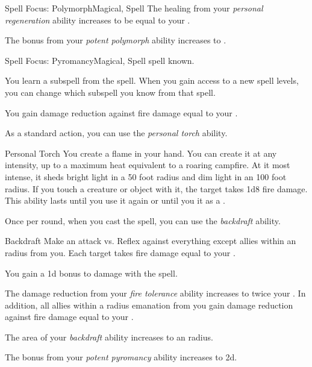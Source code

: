 \begin{feat}{Spell Focus: Polymorph}{Magical, Spell}
         The healing from your \textit{personal regeneration} ability increases to be equal to your .

         The bonus from your \textit{potent polymorph} ability increases to .
    \end{feat}

    \begin{feat}{Spell Focus: Pyromancy}{Magical, Spell}
        \featpre {} spell known.

         You learn a subspell from the  spell.
        When you gain access to a new spell levels, you can change which subspell you know from that spell.

         You gain damage reduction against fire damage equal to your .

         As a standard action, you can use the \textit{personal torch} ability.
        \begin{ability}{Personal Torch}
            You create a flame in your hand.
            You can create it at any intensity, up to a maximum heat equivalent to a roaring campfire.
            At it most intense, it sheds bright light in a 50 foot radius and dim light in an 100 foot radius.
            If you touch a creature or object with it, the target takes 1d8 fire damage.
            This ability lasts until you use it again or until you  it as a .
        \end{ability}

         Once per round, when you cast the  spell, you can use the \textit{backdraft} ability.
        \begin{ability}{Backdraft}
            Make an attack vs. Reflex against everything except allies within an \areasmall radius from you.
            \hit Each target takes fire damage equal to your .
        \end{ability}

         You gain a \plus1d bonus to damage with the  spell.

         The damage reduction from your \textit{fire tolerance} ability increases to twice your .
        In addition, all allies within a \areamed radius emanation from you gain damage reduction against fire damage equal to your .

         The area of your \textit{backdraft} ability increases to an \areamed radius.

         The bonus from your \textit{potent pyromancy} ability increases to \plus2d.
    \end{feat}

